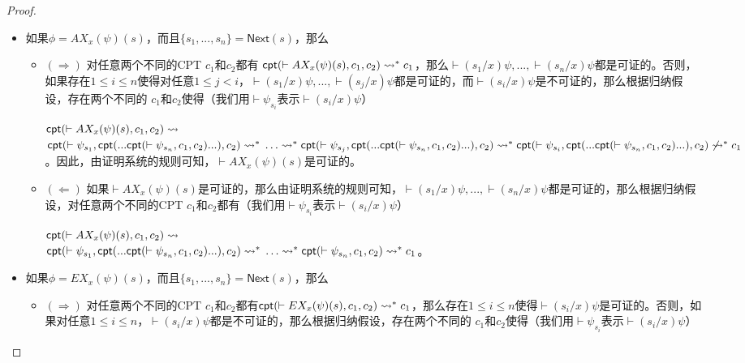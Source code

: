 {\begin{proof}
\begin{itemize}
		\item 如果$\phi = AX_x(\psi)(s)$，而且$\{s_1,...,s_n\}=\textsf{Next}(s)$，那么
		\begin{itemize}
			\item $(\Rightarrow)$ 对任意两个不同的\textsf{CPT} $c_1$和$c_2$都有
			$\textsf{cpt}(\vdash AX_x(\psi)(s), c_1, c_2)\rightsquigarrow^* c_1$，那么$\vdash(s_1/x)\psi,...,\vdash(s_n/x)\psi$都是可证的。否则，如果存在$1\le i\le n$使得对任意$1\le j < i$，$\vdash(s_1/x)\psi,...,\vdash(s_j/x)\psi$都是可证的，而$\vdash(s_i/x)\psi$是不可证的，那么根据归纳假设，存在两个不同的 \CPT{} $c_1$和$c_2$使得（我们用$\vdash\psi_{s_i}$表示$\vdash(s_i/x)\psi$）
			
			$\textsf{cpt}(\vdash
			AX_x(\psi)(s), c_1, c_2)\rightsquigarrow$ \\
			$\textsf{cpt}(\vdash\psi_{s_1},
			\textsf{cpt}(...\textsf{cpt}(\vdash\psi_{s_n}, c_1,
			c_2)...), c_2)\rightsquigarrow^*\\
			\ldots\rightsquigarrow^*\\
			\textsf{cpt}(\vdash\psi_{s_j},
			\textsf{cpt}(...\textsf{cpt}(\vdash\psi_{s_n}, c_1,
			c_2)...), c_2)\rightsquigarrow^*\\
			\textsf{cpt}(\vdash\psi_{s_i},
			\textsf{cpt}(...\textsf{cpt}(\vdash\psi_{s_n}, c_1,
			c_2)...), c_2)\not\rightsquigarrow^*
			c_1$。因此，由证明系统的规则可知，$\vdash AX_x(\psi)(s)$是可证的。
			\item $(\Leftarrow)$ 如果$\vdash AX_x(\psi)(s)$是可证的，那么由证明系统的规则可知，$\vdash(s_1/x)\psi,...,\vdash(s_n/x)\psi$都是可证的，那么根据归纳假设，对任意两个不同的\textsf{CPT} $c_1$和$c_2$都有（我们用$\vdash\psi_{s_i}$表示$\vdash(s_i/x)\psi$） 
			
			$\textsf{cpt}(\vdash
			AX_x(\psi)(s), c_1, c_2)\rightsquigarrow$ \\
			$\textsf{cpt}(\vdash\psi_{s_1},
			\textsf{cpt}(...\textsf{cpt}(\vdash\psi_{s_n}, c_1,
			c_2)...), c_2)\rightsquigarrow^*\\
			\ldots\rightsquigarrow^*\\
			\textsf{cpt}(\vdash\psi_{s_n}, c_1,
			c_2)\rightsquigarrow^*c_1$。
		\end{itemize}
		
		\item 如果$\phi = EX_x(\psi)(s)$，而且$\{s_1,...,s_n\}=\textsf{Next}(s)$，那么
		\begin{itemize}
			\item $(\Rightarrow)$ 对任意两个不同的\textsf{CPT} $c_1$和$c_2$都有$\textsf{cpt}(\vdash EX_x(\psi)(s), c_1, c_2)\rightsquigarrow^* c_1$，那么存在$1\le i\le n$使得$\vdash(s_i/x)\psi$是可证的。否则，如果对任意$1\le i\le n$，$\vdash(s_i/x)\psi$都是不可证的，那么根据归纳假设，存在两个不同的\CPT{} $c_1$和$c_2$使得（我们用$\vdash\psi_{s_i}$表示$\vdash(s_i/x)\psi$）
			

\end{itemize}
\end{itemize}
\end{proof}}
